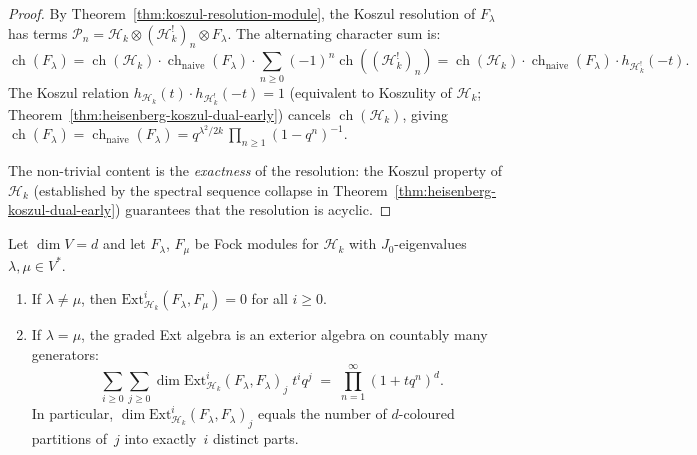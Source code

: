 \begin{proof}
By Theorem~\ref{thm:koszul-resolution-module},
the Koszul resolution of $F_\lambda$ has terms
$\mathcal{P}_n = \mathcal{H}_k \otimes (\mathcal{H}_k^!)_n
\otimes F_\lambda$.  The alternating character sum is:
\[
\operatorname{ch}(F_\lambda)
= \operatorname{ch}(\mathcal{H}_k) \cdot
  \operatorname{ch}_{\mathrm{naive}}(F_\lambda) \cdot
  \sum_{n \geq 0} (-1)^n \operatorname{ch}((\mathcal{H}_k^!)_n)
= \operatorname{ch}(\mathcal{H}_k) \cdot
  \operatorname{ch}_{\mathrm{naive}}(F_\lambda) \cdot
  h_{\mathcal{H}_k^!}(-t).
\]
The Koszul relation $h_{\mathcal{H}_k}(t) \cdot
h_{\mathcal{H}_k^!}(-t) = 1$
(equivalent to Koszulity of $\mathcal{H}_k$;
Theorem~\ref{thm:heisenberg-koszul-dual-early}) cancels
$\operatorname{ch}(\mathcal{H}_k)$, giving
$\operatorname{ch}(F_\lambda) =
\operatorname{ch}_{\mathrm{naive}}(F_\lambda)
= q^{\lambda^2/2k}\,\prod_{n \geq 1}(1-q^n)^{-1}$.

The non-trivial content is the \emph{exactness} of the resolution: the
Koszul property of $\mathcal{H}_k$ (established by the spectral
sequence collapse in Theorem~\ref{thm:heisenberg-koszul-dual-early})
guarantees that the resolution is acyclic.
\end{proof}

\begin{proposition}
\label{prop:fock-ext}
Let $\dim V = d$ and let $F_\lambda$, $F_\mu$ be Fock modules for
$\mathcal{H}_k$ with $J_0$-eigenvalues $\lambda, \mu \in V^*$.
\begin{enumerate}[label=\textup{(\roman*)}]
\item If $\lambda \neq \mu$, then
$\mathrm{Ext}^i_{\mathcal{H}_k}(F_\lambda, F_\mu) = 0$
for all $i \geq 0$.
\item If $\lambda = \mu$, the graded Ext algebra is an exterior
algebra on countably many generators:
\begin{equation}\label{eq:fock-ext-generating}
\sum_{i \geq 0} \sum_{j \geq 0}
\dim \mathrm{Ext}^i_{\mathcal{H}_k}(F_\lambda, F_\lambda)_j
\; t^i q^j
\;=\; \prod_{n=1}^{\infty}(1 + tq^n)^d.
\end{equation}
In particular,
$\dim \mathrm{Ext}^i_{\mathcal{H}_k}(F_\lambda, F_\lambda)_j$
equals the number of $d$-coloured partitions of~$j$ into exactly~$i$
distinct parts.
\end{enumerate}
\end{proposition}

